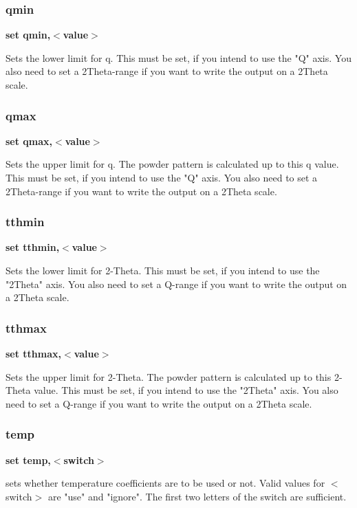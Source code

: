 \subsubsection{qmin}
{\bf set qmin,$ <$value$> $ \par }
\par
\vspace{3pt}
Sets the lower limit for q. 
This must be set, if you intend to use the "Q" axis. 
You also need to set a 2Theta-range if you want to write the output 
on a 2Theta scale. 
\subsubsection{qmax}
{\bf set qmax,$ <$value$> $ \par }
\par
\vspace{3pt}
Sets the upper limit for q. The powder pattern is calculated 
up to this q value. 
This must be set, if you intend to use the "Q" axis. 
You also need to set a 2Theta-range if you want to write the output 
on a 2Theta scale. 
\subsubsection{tthmin}
{\bf set tthmin,$ <$value$> $ \par }
\par
\vspace{3pt}
Sets the lower limit for 2-Theta. 
This must be set, if you intend to use the "2Theta" axis. 
You also need to set a Q-range if you want to write the output 
on a 2Theta scale. 
\subsubsection{tthmax}
{\bf set tthmax,$ <$value$> $ \par }
\par
\vspace{3pt}
Sets the upper limit for 2-Theta. The powder pattern is calculated 
up to this 2-Theta value. 
This must be set, if you intend to use the "2Theta" axis. 
You also need to set a Q-range if you want to write the output 
on a 2Theta scale. 
\subsubsection{temp}
{\bf set temp,$ <$switch$> $ \par }
\par
\vspace{3pt}
sets whether temperature coefficients are to be used or not. 
Valid values for $ <$switch$> $ are "use" and "ignore". The first 
two letters of the switch are sufficient. 

